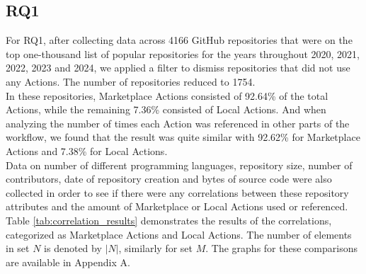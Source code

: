 \documentclass[conference]{IEEEtran}
\begin{document}
  \subsection{RQ1}
    For RQ1, after collecting data across 4166 GitHub repositories that were on the top one-thousand list of popular repositories for the years throughout 2020, 2021, 2022, 2023 and 2024, we applied a filter to dismiss repositories that did not use any Actions. The number of repositories reduced to 1754. \\ 
    In these repositories, Marketplace Actions consisted of 92.64\% of the total Actions, while the remaining 7.36\% consisted of Local Actions. And when analyzing the number of times each Action was referenced in other parts of the workflow, we found that the result was quite similar with 92.62\% for Marketplace Actions and 7.38\% for Local Actions.\\ 
    Data on number of different programming languages, repository size, number of contributors, date of repository creation and bytes of source code were also collected in order to see if there were any correlations between these repository attributes and the amount of Marketplace or Local Actions used or referenced. Table \ref{tab:correlation_results} demonstrates the results of the correlations, categorized as Marketplace Actions and Local Actions. The number of elements in set $N$ is denoted by $|N|$, similarly for set $M$. The graphs for these comparisons are available in Appendix A.\\
\end{document}
